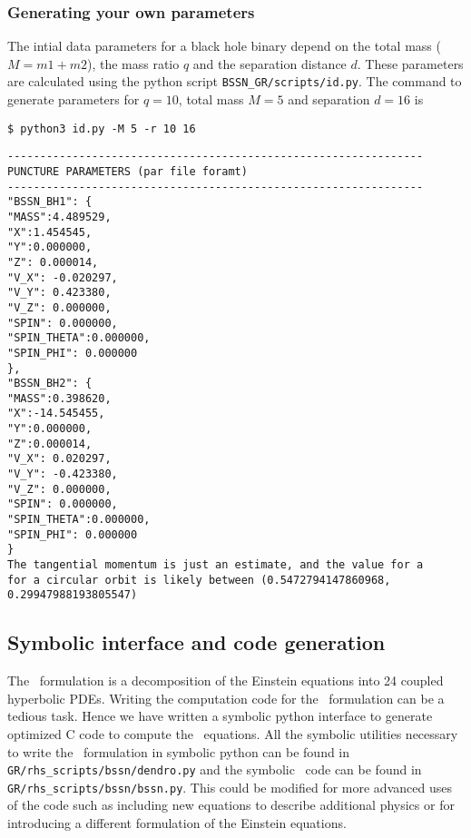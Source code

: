 \subsubsection{Generating your own parameters}
The intial data parameters for a black hole binary depend
on the total mass ($M=m1+m2$), the mass ratio $q$ and the separation distance $d$. These parameters are calculated  using the python script \texttt{BSSN\_GR/scripts/id.py}. The command to generate parameters for $q=10$, total mass $M=5$ and separation $d=16$ is 
\begin{lstlisting}
$ python3 id.py -M 5 -r 10 16
\end{lstlisting}
\begin{lstlisting}[basicstyle=\tiny]
----------------------------------------------------------------
PUNCTURE PARAMETERS (par file foramt)
----------------------------------------------------------------
"BSSN_BH1": {
"MASS":4.489529,
"X":1.454545,
"Y":0.000000,
"Z": 0.000014,
"V_X": -0.020297,
"V_Y": 0.423380,
"V_Z": 0.000000,
"SPIN": 0.000000,
"SPIN_THETA":0.000000,
"SPIN_PHI": 0.000000
},
"BSSN_BH2": {
"MASS":0.398620,
"X":-14.545455,
"Y":0.000000,
"Z":0.000014,
"V_X": 0.020297,
"V_Y": -0.423380,
"V_Z": 0.000000,
"SPIN": 0.000000,
"SPIN_THETA":0.000000,
"SPIN_PHI": 0.000000
}
The tangential momentum is just an estimate, and the value for a
for a circular orbit is likely between (0.5472794147860968, 0.29947988193805547)
\end{lstlisting}

\subsection{Symbolic interface and code generation}
The \BSSN~formulation is a decomposition of the Einstein equations into 
24 coupled hyperbolic PDEs. Writing the computation code for the 
\BSSN~formulation can be a tedious task. Hence we have written a symbolic 
python interface to generate optimized C code to compute the \BSSN~equations. 
All the symbolic utilities necessary to write the \BSSN~formulation in symbolic 
python can be found in \texttt{GR/rhs\_scripts/bssn/dendro.py} and the symbolic \BSSN~code can 
be found in \texttt{GR/rhs\_scripts/bssn/bssn.py}. 
This could be modified for more advanced uses of the code such as including
new equations to describe additional physics or for introducing a different 
formulation of the Einstein equations.


